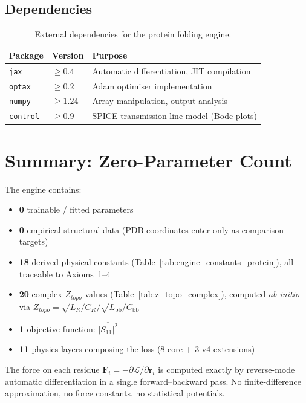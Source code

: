 \subsection{Dependencies}

\begin{table}[H]
\centering
\caption{External dependencies for the protein folding engine.}
\label{tab:dependencies}
\small
\begin{tabular}{@{}l l l@{}}
\toprule
\textbf{Package} & \textbf{Version} & \textbf{Purpose} \\
\midrule
\texttt{jax}   & $\geq 0.4$ & Automatic differentiation, JIT compilation \\
\texttt{optax} & $\geq 0.2$ & Adam optimiser implementation \\
\texttt{numpy} & $\geq 1.24$ & Array manipulation, output analysis \\
\texttt{control} & $\geq 0.9$ & SPICE transmission line model (Bode plots) \\
\bottomrule
\end{tabular}
\end{table}

\section{Summary: Zero-Parameter Count}

The engine contains:
\begin{itemize}
    \item \textbf{0} trainable / fitted parameters
    \item \textbf{0} empirical structural data (PDB coordinates enter only as comparison targets)
    \item \textbf{18} derived physical constants (Table~\ref{tab:engine_constants_protein}), all traceable to Axioms~1--4
    \item \textbf{20} complex $Z_{topo}$ values (Table~\ref{tab:z_topo_complex}), computed \emph{ab initio} via $Z_{topo} = \sqrt{L_R/C_R}/\sqrt{L_\text{bb}/C_\text{bb}}$
    \item \textbf{1} objective function: $\overline{|S_{11}|^2}$
    \item \textbf{11} physics layers composing the loss (8 core + 3 v4 extensions)
\end{itemize}

The force on each residue $\mathbf{F}_i = -\partial \mathcal{L} / \partial \mathbf{r}_i$ is computed exactly by reverse-mode automatic differentiation in a single forward--backward pass.  No finite-difference approximation, no force constants, no statistical potentials.

